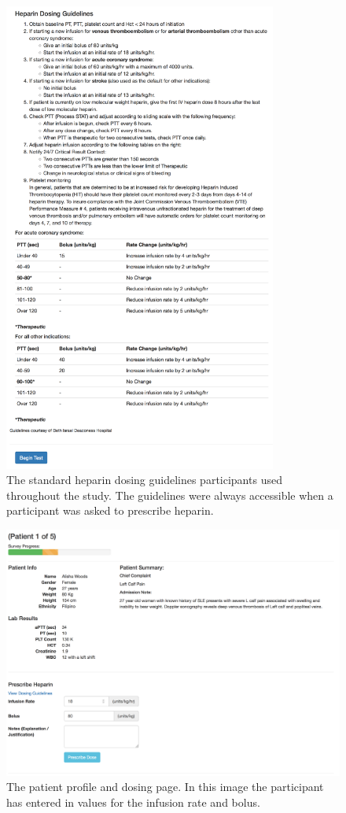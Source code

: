 \documentclass[12pt,a4paper,]{report}
\begin{document}
\begin{figure}[H]
\noindent
\includegraphics[width=0.8\textwidth]{source/figures/part3info_ii.png}
\caption{\label{fig:part3info2}The standard heparin dosing guidelines participants used throughout the study. The guidelines were always accessible when a participant was asked to prescribe heparin.}
\end{figure}

\begin{figure}[H]
\noindent
\includegraphics[width=1\textwidth]{source/figures/part3_i.png}
\caption{\label{fig:part3_i}The patient profile and dosing page. In this image the participant has entered in values for the infusion rate and bolus. }
\end{figure}
\end{document}
